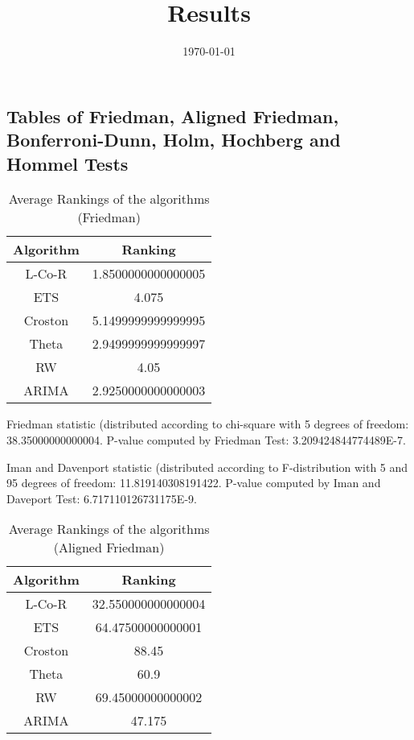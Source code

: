 \documentclass[a4paper,10pt]{article}
\title{Results}
\author{}
\date{\today}
\begin{document}
\begin{landscape}
\oddsidemargin 0in \topmargin 0in\maketitle
\section{Tables of Friedman, Aligned Friedman, Bonferroni-Dunn, Holm, Hochberg and Hommel Tests}
\begin{table}[!htp]
\centering
\caption{Average Rankings of the algorithms (Friedman)
}\begin{tabular}{c|c}
Algorithm&Ranking\\
\hline
L-Co-R&1.8500000000000005\\
ETS&4.075\\
Croston&5.1499999999999995\\
Theta&2.9499999999999997\\
RW&4.05\\
ARIMA&2.9250000000000003\\
\end{tabular}
\end{table}


Friedman statistic (distributed according to chi-square with 5 degrees of freedom: 38.35000000000004. 
P-value computed by Friedman Test: 3.209424844774489E-7.\newline

Iman and Davenport statistic (distributed according to F-distribution with 5 and 95 degrees of freedom: 11.819140308191422. 
P-value computed by Iman and Daveport Test: 6.717110126731175E-9.\newline


\newpage

\begin{table}[!htp]
\centering
\caption{Average Rankings of the algorithms (Aligned Friedman)
}\begin{tabular}{c|c}
Algorithm&Ranking\\
\hline
L-Co-R&32.550000000000004\\
ETS&64.47500000000001\\
Croston&88.45\\
Theta&60.9\\
RW&69.45000000000002\\
ARIMA&47.175\\
\end{tabular}
\end{table}



\end{landscape}
\end{document}

